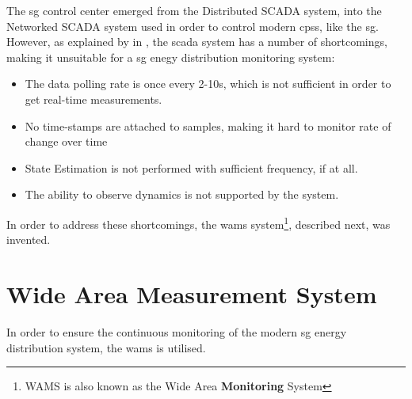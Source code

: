  
 The \acrshort{sg} control center emerged from the Distributed SCADA system, into the Networked SCADA system used in order to control modern \acrlong{cps}s, like the \acrshort{sg}.\\ 
 


 




 




However, as explained by  in \Cite{zamani2020introduction}, the \acrshort{scada} system has a number of shortcomings, making it unsuitable for a \acrshort{sg} enegy distribution monitoring system:

\begin{itemize}
    \item The data polling rate is once every 2-10s, which is not sufficient in order to get real-time measurements.
    \item No time-stamps are attached to samples, making it hard to monitor rate of change over time
    \item State Estimation is not performed with sufficient frequency, if at all.
    \item The ability to observe dynamics is not supported by the system.
\end{itemize}





In order to address these shortcomings, the \acrfull{wams} system\footnote{WAMS is also known as the Wide Area \textbf{Monitoring} System}, described next, was invented.




\section{Wide Area Measurement System}
\label{fig:Kumar-WAMS-architecture}
%
   

In order to ensure the continuous monitoring of the modern \acrlong{sg} energy distribution system, the \acrfull{wams} is utilised.%

